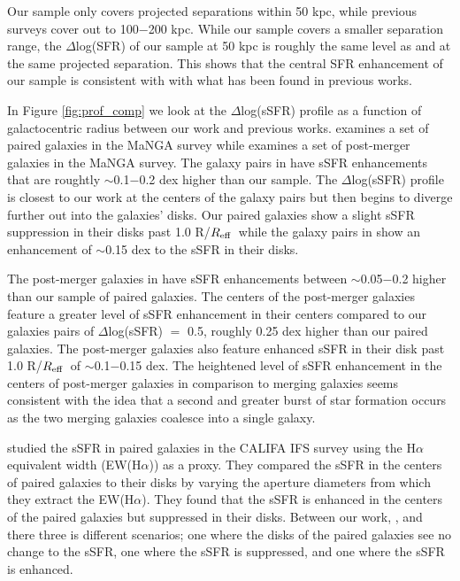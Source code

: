 \documentclass[iop,revtex4,twocolumn,apj,numberedappendix,appendixfloats]{emulateapj}
\newcommand{\reff}{$R_{\rm eff}$}
\newcommand{\ewha}{EW(H$\alpha$)}
\begin{document}
Our sample only covers projected separations within 50 kpc, while previous surveys cover out to 100$-$200 kpc. While our sample covers a smaller separation range, the $\Delta$log(SFR) of our sample at 50 kpc is roughly the same level as \citet{Scudder:2012} and \citet{Patton:2013} at the same projected separation. This shows that the central SFR enhancement of our sample is consistent with with what has been found in previous works. 

In Figure \ref{fig:prof_comp} we look at the $\Delta$log(sSFR) profile as a function of galactocentric radius between our work and previous works. \citet{Pan:2019} examines a set of paired galaxies in the MaNGA survey while \citet{Thorp:2019} examines a set of post-merger galaxies in the MaNGA survey. The galaxy pairs in \citet{Pan:2019} have sSFR enhancements that are roughtly $\sim$0.1$-$0.2 dex higher than our sample. The $\Delta$log(sSFR) profile is closest to our work at the centers of the galaxy pairs but then begins to diverge further out into the galaxies' disks. Our paired galaxies show a slight sSFR suppression in their disks past 1.0 R/\reff\ while the galaxy pairs in \citet{Pan:2019} show an enhancement of $\sim$0.15 dex to the sSFR in their disks. 

The post-merger galaxies in \citet{Thorp:2019} have sSFR enhancements between $\sim$0.05$-$0.2 higher than our sample of paired galaxies. The centers of the post-merger galaxies feature a greater level of sSFR enhancement in their centers compared to our galaxies pairs of $\Delta$log(sSFR) $=$ 0.5, roughly 0.25 dex higher than our paired galaxies. The post-merger galaxies also feature enhanced sSFR in their disk past 1.0 R/\reff\ of $\sim$0.1$-$0.15 dex. The heightened level of sSFR enhancement in the centers of post-merger galaxies in comparison to merging galaxies seems consistent with the idea that a second and greater burst of star formation occurs as the two merging galaxies coalesce into a single galaxy. 

\citet{Barrera-Ballesteros:2015} studied the sSFR in paired galaxies in the CALIFA IFS survey using the H$\alpha$ equivalent width (\ewha) as a proxy. They compared the sSFR in the centers of paired galaxies to their disks by varying the aperture diameters from which they extract the \ewha. They found that the sSFR is enhanced in the centers of the paired galaxies but suppressed in their disks. Between our work, \citet{Barrera-Ballesteros:2015}, and \citet{Pan:2019} there three is different scenarios; one where the disks of the paired galaxies see no change to the sSFR, one where the sSFR is suppressed, and one where the sSFR is enhanced. 
\end{document}

